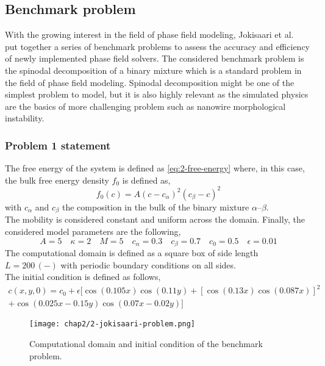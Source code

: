 \subsection{Benchmark problem}
    With the growing interest in the field of phase field modeling, Jokisaari et al.\ \cite{JokisaariVoorheesGuyerWarrenHeinonen2017} put together a series of benchmark problems to assess the accuracy and efficiency of newly implemented phase field solvers. The considered benchmark problem is the spinodal decomposition of a binary mixture which is a standard problem in the field of phase field modeling. Spinodal decomposition might be one of the simplest problem to model, but it is also highly relevant as the simulated physics are the basics of more challenging problem such as nanowire morphological instability.
    \subsubsection{Problem 1 statement}
    The free energy of the system is defined as \autoref{eq:2-free-energy} where, in this case, the bulk free energy density $f_0$ is defined as,
    \begin{equation}
        f_0(c) = A (c-c_{\alpha})^2 (c_{\beta}-c)^2
    \end{equation}
    with $c_{\alpha}$ and $c_{\beta}$ the composition in the bulk of the binary mixture $\alpha$--$\beta$.\\
    The mobility is considered constant and uniform across the domain.
    Finally, the considered model parameters are the following,
    \begin{equation}
        A = 5 \quad \kappa = 2 \quad M = 5 \quad c_{\alpha} = 0.3 \quad c_{\beta} = 0.7 \quad c_0 = 0.5 \quad \epsilon = 0.01
    \end{equation}
    The computational domain is defined as a square box of side length $L=200\,(-)$ with periodic boundary conditions on all sides.\\
    The initial condition is defined as follows,
    \begin{equation}
        \begin{aligned}
            c(x, y, 0) = c_0 + \epsilon [\cos{(0.105x)}\cos{(0.11y)}+\left[\cos{(0.13x)}\cos{(0.087x)}\right]^2\\
            +\cos{(0.025x-0.15y)}\cos{(0.07x-0.02y)}]
        \end{aligned}
    \end{equation}
    \begin{figure}[H]
        \centering
        \texttt{[image: chap2/2-jokisaari-problem.png]}
        \caption{Computational domain and initial condition of the benchmark problem.}
        \label{fig:2-jokisaari-problem}
    \end{figure}
